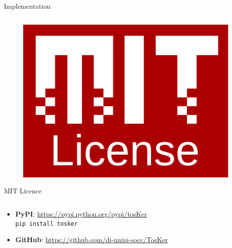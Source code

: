 \documentclass{beamer}
\begin{document}
\begin{frame}{Implementation}
\begin{columns}[b]
\begin{column}{.3\textwidth}
\begin{figure}
            \includegraphics[width=.6\textwidth]{img/mit.png}
          \end{figure}
          {\large MIT Licence}
      \end{column}
    \end{columns}
      \vspace{20pt}
      \begin{itemize}
        \item %
          \small\textbf{PyPI}: \href{https://pypi.python.org/pypi/tosKer}{https://pypi.python.org/pypi/tosKer}\\
          \indent\indent\texttt{pip install tosker}\vspace{10pt}
        \item %
          \small\textbf{GitHub}: \href{https://github.com/di-unipi-socc/TosKer}{https://github.com/di-unipi-socc/TosKer}
      \end{itemize}
  \end{frame}
\end{document}
